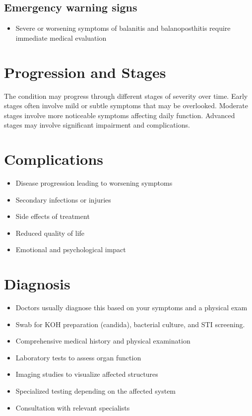 \subsection{Emergency warning signs}
\begin{itemize}[noitemsep]
  \item Severe or worsening symptoms of balanitis and balanoposthitis require immediate medical evaluation
\end{itemize}
\section{Progression and Stages}
The condition may progress through different stages of severity over time. Early stages often involve mild or subtle symptoms that may be overlooked. Moderate stages involve more noticeable symptoms affecting daily function. Advanced stages may involve significant impairment and complications.
\section{Complications}
\begin{itemize}[noitemsep]
  \item Disease progression leading to worsening symptoms
  \item Secondary infections or injuries
  \item Side effects of treatment
  \item Reduced quality of life
  \item Emotional and psychological impact
\end{itemize}
\section{Diagnosis}
\begin{itemize}[noitemsep]
  \item Doctors usually diagnose this based on your symptoms and a physical exam
  \item Swab for KOH preparation (candida), bacterial culture, and STI screening.
  \item Comprehensive medical history and physical examination
  \item Laboratory tests to assess organ function
  \item Imaging studies to visualize affected structures
  \item Specialized testing depending on the affected system
  \item Consultation with relevant specialists
\end{itemize}
